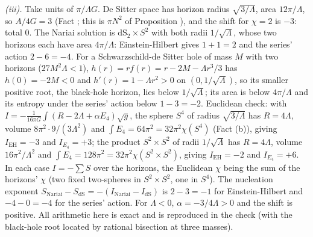 \emph{(iii).} Take units of $\pi/\Lambda G$. De Sitter space has horizon radius $\sqrt{3/\Lambda}$, area $12\pi/\Lambda$, so $A/4G = 3$ (Fact ; this is $\pi N^{2}$ of Proposition ), and the shift for $\chi = 2$ is $-3$: total $0$. The Nariai solution is $\mathrm{dS}_{2}\times S^{2}$ with both radii $1/\sqrt{\Lambda}$, whose two horizons each have area $4\pi/\Lambda$: Einstein-Hilbert gives $1 + 1 = 2$ and the series' action $2 - 6 = -4$. For a Schwarzschild-de Sitter hole of mass $M$ with two horizons ($27M^{2}\Lambda < 1$), $h(r) = r f(r) = r - 2M - \Lambda r^{3}/3$ has $h(0) = -2M < 0$ and $h'(r) = 1 - \Lambda r^{2} > 0$ on $(0, 1/\sqrt{\Lambda})$, so its smaller positive root, the black-hole horizon, lies below $1/\sqrt{\Lambda}$; its area is below $4\pi/\Lambda$ and its entropy under the series' action below $1 - 3 = -2$. Euclidean check: with $I = -\frac{1}{16\pi G}\int(R - 2\Lambda + \alpha E_{4})\sqrt{g}$, the sphere $S^{4}$ of radius $\sqrt{3/\Lambda}$ has $R = 4\Lambda$, volume $8\pi^{2}\cdot 9/(3\Lambda^{2})$ and $\int E_{4} = 64\pi^{2} = 32\pi^{2}\chi(S^{4})$ (Fact (b)), giving $I_{\mathrm{EH}} = -3$ and $I_{E_{4}} = +3$; the product $S^{2}\times S^{2}$ of radii $1/\sqrt{\Lambda}$ has $R = 4\Lambda$, volume $16\pi^{2}/\Lambda^{2}$ and $\int E_{4} = 128\pi^{2} = 32\pi^{2}\chi(S^{2}\times S^{2})$, giving $I_{\mathrm{EH}} = -2$ and $I_{E_{4}} = +6$. In each case $I = -\sum S$ over the horizons, the Euclidean $\chi$ being the sum of the horizons' $\chi$ (two fixed two-spheres in $S^{2}\times S^{2}$, one in $S^{4}$). The nucleation exponent $S_{\mathrm{Nariai}} - S_{\mathrm{dS}} = -(I_{\mathrm{Nariai}} - I_{\mathrm{dS}})$ is $2 - 3 = -1$ for Einstein-Hilbert and $-4 - 0 = -4$ for the series' action. For $\Lambda < 0$, $\alpha = -3/4\Lambda > 0$ and the shift is positive. All arithmetic here is exact and is reproduced in the check (with the black-hole root located by rational bisection at three masses).
